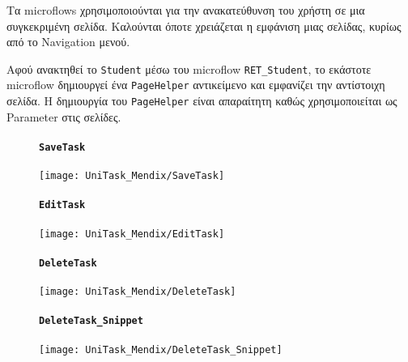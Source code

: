                 Τα microflows χρησιμοποιούνται για την ανακατεύθυνση του χρήστη σε μια συγκεκριμένη σελίδα. Καλούνται όποτε χρειάζεται η εμφάνιση μιας σελίδας, κυρίως από το Navigation μενού.

                Αφού ανακτηθεί το \texttt{Student} μέσω του microflow \texttt{RET\_Student}, το εκάστοτε microflow δημιουργεί ένα \texttt{PageHelper} αντικείμενο και εμφανίζει την αντίστοιχη σελίδα. Η δημιουργία του \texttt{PageHelper} είναι απαραίτητη καθώς χρησιμοποιείται ως Parameter στις σελίδες.

                \begin{figure}[H] \noindent
                    \paragraph{\texttt{SaveTask}}
                    \begin{center}
                        \texttt{[image: UniTask\_Mendix/SaveTask]}
                    \end{center}
                \end{figure}

                \begin{figure}[H] \noindent
                    \paragraph{\texttt{EditTask}}
                    \begin{center}
                        \texttt{[image: UniTask\_Mendix/EditTask]}
                    \end{center}
                \end{figure}

                \begin{figure}[H] \noindent
                    \paragraph{\texttt{DeleteTask}}
                    \begin{center}
                        \texttt{[image: UniTask\_Mendix/DeleteTask]}
                    \end{center}
                \end{figure}

                \begin{figure}[H] \noindent
                    \paragraph{\texttt{DeleteTask\_Snippet}}
                    \begin{center}
                        \texttt{[image: UniTask\_Mendix/DeleteTask\_Snippet]}
                    \end{center}
                \end{figure}

